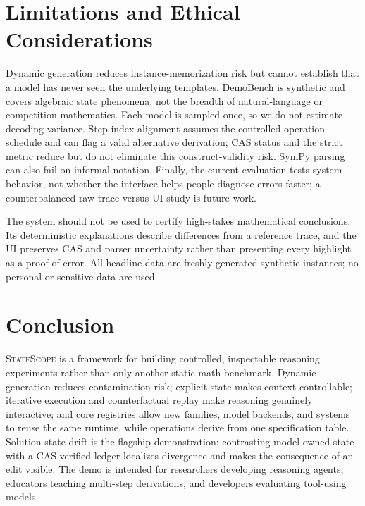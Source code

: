 \documentclass[11pt]{article}
\newcommand{\systemname}{\textsc{StateScope}}
\begin{document}
\section{Limitations and Ethical Considerations}

Dynamic generation reduces instance-memorization risk but cannot establish that a
model has never seen the underlying templates.  DemoBench is synthetic and covers
algebraic state phenomena, not the breadth of
natural-language or competition mathematics.  Each model is sampled once, so we do
not estimate decoding variance.  Step-index alignment assumes the controlled
operation schedule and can flag a valid alternative derivation; CAS status and the
strict metric reduce but do not eliminate this construct-validity risk.  SymPy
parsing can also fail on informal notation.  Finally, the current evaluation tests
system behavior, not whether the interface helps people diagnose errors faster; a
counterbalanced raw-trace versus UI study is future work.

The system should not be used to certify high-stakes mathematical conclusions.
Its deterministic explanations describe differences from a reference trace, and
the UI preserves CAS and parser uncertainty rather than presenting every highlight
as a proof of error.  All headline data are freshly generated synthetic instances;
no personal or sensitive data are used.

\section{Conclusion}

\systemname{} is a framework for building controlled, inspectable reasoning
experiments rather than only another static math benchmark.  Dynamic generation
reduces contamination risk; explicit state makes context controllable; iterative
execution and counterfactual replay make reasoning genuinely interactive; and
core registries allow new families, model backends, and systems to reuse the same
runtime, while operations derive from one specification table.  Solution-state
drift is the flagship demonstration: contrasting
model-owned state with a CAS-verified ledger localizes divergence and makes the
consequence of an edit visible.  The demo is intended for researchers developing
reasoning agents, educators teaching multi-step derivations, and developers
evaluating tool-using models.
\end{document}
